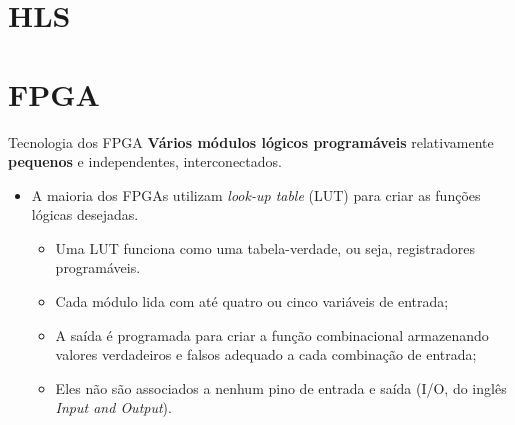 \section{HLS}

\section{FPGA}
   
   \begin{frame}{Tecnologia dos FPGA} \vspace{-1em}
      \textbf{Vários módulos lógicos programáveis} relativamente \textbf{pequenos} e independentes, interconectados.
      
      \begin{itemize}
         \item A maioria dos FPGAs utilizam \textit{look-up table} (LUT) para criar as funções lógicas desejadas.
         \begin{itemize} 
            \setlength{\itemsep}{1.5em}
            \item Uma LUT funciona como uma tabela-verdade, ou seja, registradores programáveis. 
            \item Cada módulo lida com até quatro ou cinco variáveis de entrada;
            \item A saída é programada para criar a função combinacional armazenando valores verdadeiros e falsos adequado a cada combinação de entrada;
            \item Eles não são associados a nenhum pino de entrada e saída (I/O, do inglês \textit{Input and Output}). 
         \end{itemize}
         
      \end{itemize}
   \end{frame}
   
